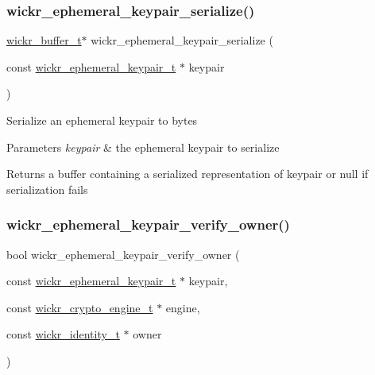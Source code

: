 \subsubsection{\texorpdfstring{wickr\+\_\+ephemeral\+\_\+keypair\+\_\+serialize()}{wickr\_ephemeral\_keypair\_serialize()}}
{\footnotesize\ttfamily \hyperlink{structwickr__buffer}{wickr\+\_\+buffer\+\_\+t}$\ast$ wickr\+\_\+ephemeral\+\_\+keypair\+\_\+serialize (\begin{DoxyParamCaption}\item[{const \hyperlink{structwickr__ephemeral__keypair}{wickr\+\_\+ephemeral\+\_\+keypair\+\_\+t} $\ast$}]{keypair }\end{DoxyParamCaption})}

Serialize an ephemeral keypair to bytes


\begin{DoxyParams}{Parameters}
{\em keypair} & the ephemeral keypair to serialize \\
\hline
\end{DoxyParams}
\begin{DoxyReturn}{Returns}
a buffer containing a serialized representation of \textquotesingle{}keypair\textquotesingle{} or null if serialization fails 
\end{DoxyReturn}
\mbox{\label{group__wickr__ephemeral__keypair_gadc17110d4c7fa65a9456fae516bf2e5d}} 
\subsubsection{\texorpdfstring{wickr\+\_\+ephemeral\+\_\+keypair\+\_\+verify\+\_\+owner()}{wickr\_ephemeral\_keypair\_verify\_owner()}}
{\footnotesize\ttfamily bool wickr\+\_\+ephemeral\+\_\+keypair\+\_\+verify\+\_\+owner (\begin{DoxyParamCaption}\item[{const \hyperlink{structwickr__ephemeral__keypair}{wickr\+\_\+ephemeral\+\_\+keypair\+\_\+t} $\ast$}]{keypair,  }\item[{const \hyperlink{structwickr__crypto__engine}{wickr\+\_\+crypto\+\_\+engine\+\_\+t} $\ast$}]{engine,  }\item[{const \hyperlink{structwickr__identity}{wickr\+\_\+identity\+\_\+t} $\ast$}]{owner }\end{DoxyParamCaption})}

